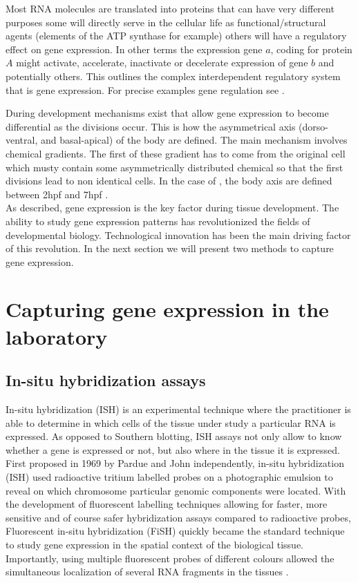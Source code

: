 	Most RNA molecules are translated into proteins that can have very different purposes some will directly serve in the cellular life as functional/structural agents (elements of the ATP synthase for example) others will have a regulatory effect on gene expression. In other terms the expression gene $a$, coding for protein $A$ might activate, accelerate, inactivate or decelerate expression of gene $b$ and potentially others. This outlines the complex interdependent regulatory system that is gene expression. For precise examples gene regulation see \cite{gossen92, shinozaki03,fuqua01,balmer02}.\\
	
	
	During development mechanisms exist that allow gene expression to become differential as the divisions occur. This is how the asymmetrical axis (dorso-ventral, and basal-apical) of the body are defined. The main mechanism involves chemical gradients. The first of these gradient has to come from the original cell which musty contain some asymmetrically distributed chemical so that the first divisions lead to non identical cells. In the case of \platyfull{}, the body axis are defined  between 2hpf and 7hpf \cite{Fischer10}.\\
	
	As described, gene expression is the key factor during tissue development. The ability to study gene expression patterns has revolutionized the fields of developmental biology. Technological innovation has been the main driving factor of this revolution. In the next section we will present two methods to capture gene expression.


\section{Capturing gene expression in the laboratory}\label{sec:gene_expression_lab}
     \subsection{In-situ hybridization assays}
     In-situ hybridization (ISH) is an experimental technique where the practitioner is able to determine in which cells of the tissue under study a particular RNA is expressed. As opposed to Southern blotting, ISH assays not only allow to know whether a gene is expressed or not, but also where in the tissue it is expressed. First proposed in 1969 by Pardue \cite{pardue69} and John \cite{john69} independently, in-situ hybridization (ISH) used radioactive tritium labelled probes on a photographic emulsion to reveal on which chromosome particular genomic components were located. With the development of fluorescent labelling techniques \cite{landegent84,pinkel88} allowing for faster, more sensitive and of course safer hybridization assays \cite{swiger96} compared to radioactive probes, Fluorescent in-situ hybridization (FiSH) quickly became the standard technique to study gene expression in the spatial context of the biological tissue. Importantly, using multiple fluorescent probes of different colours allowed the simultaneous localization of several RNA fragments in the tissues \cite{nederlof89}.
     

